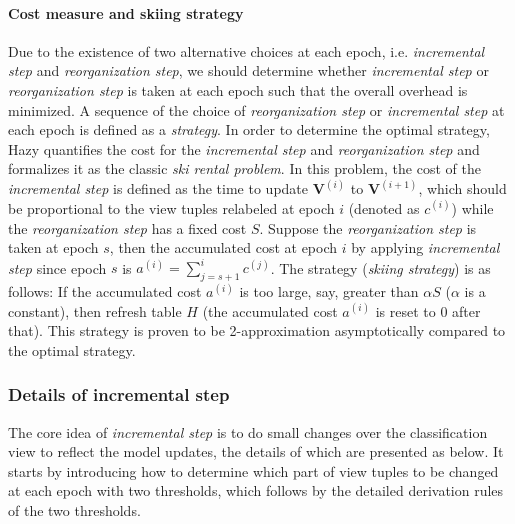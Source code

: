 \paragraph{Cost measure and skiing strategy} Due to the existence of two alternative choices at each epoch, i.e. {\em incremental step} and {\em reorganization step}, we should determine whether {\em incremental step} or {\em reorganization step} is taken at each epoch such that the overall overhead is minimized. A sequence of the choice of {\em reorganization step} or {\em incremental step} at each epoch is defined as a {\em strategy}. In order to determine the optimal strategy, Hazy quantifies the cost for the {\em incremental step} and {\em reorganization step} and formalizes it as the classic {\em ski rental problem}. In this problem, the cost of the {\em incremental step} is defined as the time to update $\textbf{V}^{(i)}$ to $\textbf{V}^{(i+1)}$, which should be proportional to the view tuples relabeled at epoch $i$ (denoted as $c^{(i)}$) while the {\em reorganization step} has a fixed cost $S$. Suppose the {\em reorganization step} is taken at epoch $s$, then the accumulated cost at epoch $i$ by applying {\em incremental step} since epoch $s$ is $a^{(i)} = \sum_{j=s+1}^ic^{(j)}$. The strategy ({\em skiing strategy}) is as follows: If the accumulated cost $a^{(i)}$ is too large, say, greater than $\alpha S$ ($\alpha$ is a constant), then refresh table $H$ (the accumulated cost $a^{(i)}$ is reset to 0 after that). This strategy is proven to be 2-approximation asymptotically compared to the optimal strategy.


\subsubsection{Details of incremental step}\label{Sec: incremental step}
The core idea of {\em incremental step} is to do small changes over the classification view to reflect the model updates, the details of which are presented as below. It starts by introducing how to determine which part of view tuples to be changed at each epoch with two thresholds, which follows by the detailed derivation rules of the two thresholds.

